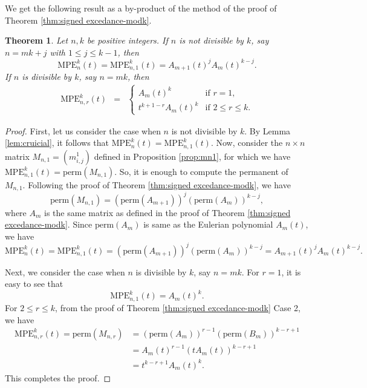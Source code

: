 \documentclass[12pt]{article}
\newcommand{\Perm}{\mathrm{perm}}
\newcommand{\MPE}{\mathrm{MPE}}
\newtheorem{theorem}{\bf Theorem}[section]
\begin{document}
We get the following result as a by-product of the method of the proof of Theorem \ref{thm:signed excedance-modk}. 

\begin{theorem}
\label{thm:unsigned excedance-modk}
Let $n,k$ be positive integers. If $n$ is not divisible by $k$, say $n=mk+j$ with $1 \leq j \leq k-1$, then 
\[\MPE_n^k(t)= \MPE_{n,1}^k(t)= A_{m+1}(t)^{j} A_{m}(t)^{k-j}.  \] 
If $n$ is divisible by $k$, say $n=mk$, then 
\begin{eqnarray*}
\MPE_{n,r}^k(t)  & = & \begin{cases}
A_m(t)^k & \text {if $r=1$}, \\
t^{k+1-r} A_m(t)^k & \text {if $2 \leq r \leq k$}.
 \end{cases}
\end{eqnarray*} 
\end{theorem}

\begin{proof}
First, let us consider the case when $n$ is not divisible by $k$. 
By Lemma \ref{lem:cruicial}, it follows that $\MPE_n^k(t)= \MPE_{n,1}^k(t)$. Now, consider the  $n \times n$ matrix $M_{n,1}= (m^1_{i,j})$ defined in Proposition \ref{prop:mn1}, for which we have $\MPE_{n,1}^k(t)=\Perm(M_{n,1})$. So, it is enough to compute the permanent of $M_{n,1}.$  Following the proof of Theorem \ref{thm:signed excedance-modk}, we have 
\[ \Perm(M_{n,1})=(\Perm(A_{m+1}))^j (\Perm(A_{m}))^{k-j}, \]
where $A_m$ is the same matrix
as defined in the proof of Theorem \ref{thm:signed excedance-modk}. Since $\Perm(A_m)$ is same as the Eulerian polynomial $A_m(t)$, we have 
\[ \MPE_n^k(t)= \MPE_{n,1}^k(t) =  (\Perm(A_{m+1}))^j (\Perm(A_{m}))^{k-j} 
=A_{m+1}(t)^j A_m(t)^{k-j} .\]
 
Next, we consider the case when $n$ is divisible by $k$, say $n=mk$.
For $r=1$, it is easy to see that 
\[ \MPE_{n,1}^k(t) = A_m(t)^k .\] 
For $2 \leq r \leq k$, from the proof of Theorem \ref{thm:signed excedance-modk} Case 2, we have 
\begin{align*}
  \MPE_{n,r}^k(t)  = \Perm (M_{n,r}) &= (\Perm(A_{m}))^{r-1} (\Perm(B_{m}))^{k-r+1} \\  
& = A_m(t)^{r-1} (tA_m(t))^{k-r+1} \\
& = t^{k-r+1} A_m(t)^k.
\end{align*}
This completes the proof. 
\end{proof}


 
\end{document}
